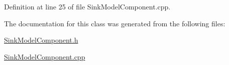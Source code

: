 Definition at line 25 of file Sink\-Model\-Component.\-cpp.



The documentation for this class was generated from the following files\-:\begin{DoxyCompactItemize}
\item 
\hyperlink{_sink_model_component_8h}{Sink\-Model\-Component.\-h}\item 
\hyperlink{_sink_model_component_8cpp}{Sink\-Model\-Component.\-cpp}\end{DoxyCompactItemize}

